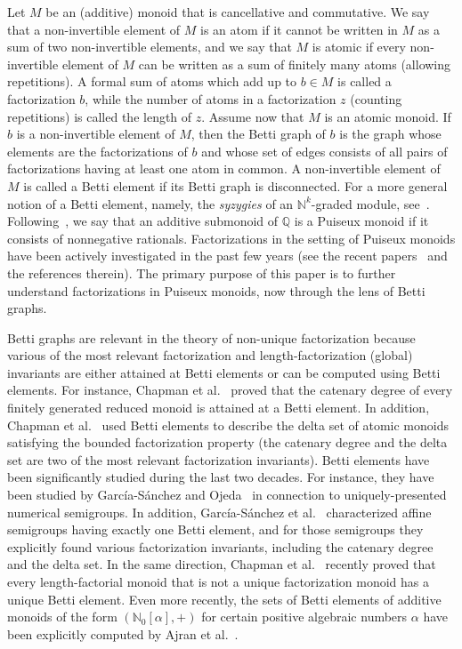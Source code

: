\documentclass[12pt]{amsart}
\theoremstyle{definition}
\numberwithin{equation}{section}
\newcommand{\nn}{\mathbb{N}}
\newcommand{\qq}{\mathbb{Q}}
\begin{document}
Let $M$ be an (additive) monoid that is cancellative and commutative. We say that a non-invertible element of $M$ is an atom if it cannot be written in $M$ as a sum of two non-invertible elements, and we say that $M$ is atomic if every non-invertible element of $M$ can be written as a sum of finitely many atoms (allowing repetitions). A formal sum of atoms which add up to $b \in M$ is called a factorization $b$, while the number of atoms in a factorization $z$ (counting repetitions) is called the length of $z$. Assume now that $M$ is an atomic monoid. If $b$ is a non-invertible element of $M$, then the Betti graph of $b$ is the graph whose elements are the factorizations of $b$ and whose set of edges consists of all pairs of factorizations having at least one atom in common. A non-invertible element of $M$ is called a Betti element if its Betti graph is disconnected. For a more general notion of a Betti element, namely, the \emph{syzygies} of an $\nn^k$-graded module, see~\cite{MS04}. Following~\cite{fG17}, we say that an additive submonoid of $\qq$ is a Puiseux monoid if it consists of nonnegative rationals. Factorizations in the setting of Puiseux monoids have been actively investigated in the past few years (see the recent papers~\cite{CGG21,GGT21} and the references therein). The primary purpose of this paper is to further understand factorizations in Puiseux monoids, now through the lens of Betti graphs.
\smallskip

Betti graphs are relevant in the theory of non-unique factorization because various of the most relevant factorization and length-factorization (global) invariants are either attained at Betti elements or can be computed using Betti elements. For instance, Chapman et al.~\cite{CGLPR06} proved that the catenary degree of every finitely generated reduced monoid is attained at a Betti element. In addition, Chapman et al.~\cite{CGLMS12} used Betti elements to describe the delta set of atomic monoids satisfying the bounded factorization property (the catenary degree and the delta set are two of the most relevant factorization invariants). Betti elements have been significantly studied during the last two decades. For instance, they have been studied by Garc\'ia-S\'anchez and Ojeda~\cite{GO10} in connection to uniquely-presented numerical semigroups. In addition, Garc\'ia-S\'anchez et al.~\cite{GOR13} characterized affine semigroups having exactly one Betti element, and for those semigroups they explicitly found various factorization invariants, including the catenary degree and the delta set. In the same direction, Chapman et al.~\cite{CCGS21} recently proved that every length-factorial monoid that is not a unique factorization monoid has a unique Betti element. Even more recently, the sets of Betti elements of additive monoids of the form $(\nn_0[\alpha],+)$ for certain positive algebraic numbers $\alpha$ have been explicitly computed by Ajran et al.~\cite{ABLST23}.
\smallskip
\end{document}
